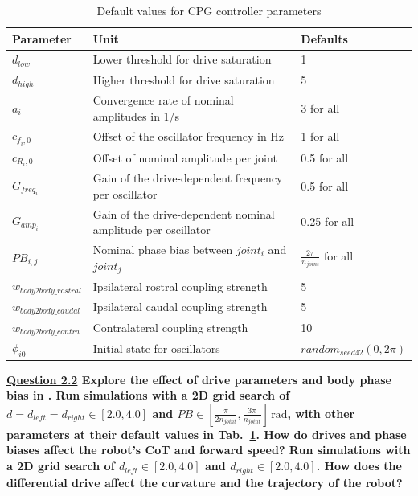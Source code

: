 \documentclass{cmc}
\begin{document}
\begin{table}[H]
\centering


\begin{tabular}{|p{}|p{}|p{}|}
    \hline
    Parameter & Unit & Defaults \\
    \hline
    $d_{low}$ & Lower threshold for drive saturation & 1\\
    $d_{high}$ & Higher threshold for drive saturation & 5\\
    $a_i$ & Convergence rate of nominal amplitudes in 1/s& 3 for all\\
    $c_{f_i,0}$ & Offset of the oscillator frequency in Hz & 1 for all\\
    $c_{R_i,0}$ & Offset of nominal amplitude per joint & 0.5 for all\\
    $G_{freq_i}$ & Gain of the drive-dependent frequency per oscillator & 0.5 for all\\
    $G_{amp_i}$ & Gain of the drive-dependent nominal amplitude per oscillator & 0.25 for all\\
    $PB_{i,j}$ & Nominal phase bias between $joint_i$ and $joint_j$& $\frac{2\pi}{n_{joint}}$ for all\\
    $w_{body2body\_rostral}$ & Ipsilateral rostral coupling strength & 5\\
    $w_{body2body\_caudal}$ & Ipsilateral caudal coupling strength & 5\\
    $w_{body2body\_contra}$ & Contralateral coupling strength & 10\\
    $\phi_{i0}$ & Initial state for oscillators & $random_{seed42}(0, 2\pi)$\\
    \hline
\end{tabular}
\caption{\label{tab:cpg_params}Default values for CPG controller parameters}
\end{table}


\textbf{\underline{Question 2.2} Explore the effect of drive parameters and body phase bias in
. Run simulations
with a 2D grid search of
$d = d_{left} = d_{right} \in [2.0,4.0]$ and
$PB \in [\frac{\pi}{2n_{joint}}, \frac{3\pi}{n_{joint}}]\,\mathrm{rad}$,
with other parameters at their default values in
Tab.~\ref{tab:cpg_params}. How do drives and phase biases affect the
robot's CoT and forward speed? Run simulations with a 2D grid search of
$d_{left} \in [2.0,4.0]$ and $d_{right} \in [2.0,4.0]$. How does the
differential drive affect the curvature and the trajectory of the robot?}
\end{document}
